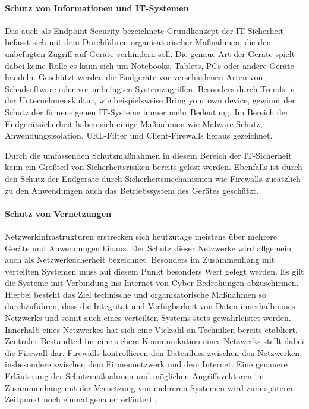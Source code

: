 \documentclass[utf8,biblatex]{lni}
\begin{document}
\paragraph{Schutz von Informationen und IT-Systemen}
Das auch als \glqq Endpoint Security\grqq{} bezeichnete Grundkonzept der IT-Sicherheit befasst sich mit dem Durchführen 
organisatorischer Maßnahmen, die den unbefugten Zugriff auf Geräte verhindern soll. 
Die genaue Art der Geräte spielt dabei keine Rolle es kann sich um Notebooks, Tablets, PCs oder andere Geräte handeln. 
Geschützt werden die Endgeräte vor verschiedenen Arten von Schadsoftware oder vor unbefugten Systemzugriffen. 
Besonders durch Trends in der Unternehmenskultur, wie beispielsweise \glqq Bring your own device\grqq{}, gewinnt der Schutz der firmeneigenen 
IT-Systeme immer mehr Bedeutung. 
Im Bereich der Endgerätsicherheit haben sich einige Maßnahmen wie Malware-Schutz, Anwendungsisolation, URL-Filter und Client-Firewalls heraus gezeichnet.
\citet{Luber.2020}

Durch die umfassenden Schutzmaßnahmen in diesem Bereich der IT-Sicherheit kann ein Großteil von Sicherheitsrisiken bereits 
gelöst werden. Ebenfalls ist durch den Schutz der Endgeräte durch Sicherheitsmechanismen wie Firewalls zusätzlich zu den 
Anwendungen auch das Betriebssystem des Gerätes geschützt. 

\paragraph{Schutz von Vernetzungen}
Netzwerkinfrastrukturen erstrecken sich heutzutage meistens über mehrere Geräte und Anwendungen hinaus. Der Schutz dieser 
Netzwerke wird allgemein auch als Netzwerksicherheit bezeichnet. Besonders im Zusammenhang mit verteilten Systemen muss auf diesem Punkt besonders Wert gelegt werden.
Es gilt die Systeme mit Verbindung ins Internet von Cyber-Bedrohungen abzuschirmen. Hierbei besteht das Ziel technische und organisatorische 
Maßnahmen so durchzuführen, dass die Integrität und Verfügbarkeit von Daten innerhalb eines Netzwerks und somit auch eines verteilten Systems stets gewährleistet werden. 
Innerhalb eines Netzwerkes hat sich eine Vielzahl an Techniken bereits etabliert. 
Zentraler Bestandteil für eine sichere Kommunikation eines Netzwerks stellt dabei die Firewall dar. Firewalls kontrollieren den Datenfluss zwischen den 
Netzwerken, insbesondere zwischen dem Firmennetzwerk und dem Internet. Eine genauere Erläuterung der Schutzmaßnahmen und möglichen Angriffsvektoren im Zusammenhang mit 
der Vernetzung von mehreren Systemen wird zum späteren Zeitpunkt noch einmal genauer erläutert \citet{Schonschek.2017b}. 
\end{document}
